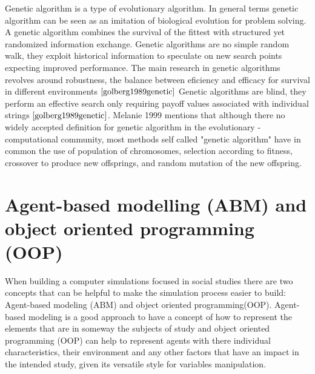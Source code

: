 Genetic algorithm is a type of evolutionary algorithm. In general terms genetic algorithm can be seen as an imitation of biological evolution for problem solving. A genetic algorithm combines the survival of the fittest with  structured yet randomized information exchange. Genetic algorithms are no simple random walk, they exploit historical information to speculate on new search points expecting improved performance. The main research in genetic algorithms revolves around robustness, the balance between eficiency and efficacy for survival in different environments $\cite{golberg1989genetic}$ Genetic algorithms are blind, they perform an effective search only requiring payoff values associated with individual strings $\cite{golberg1989genetic}$.  Melanie 1999 mentions that although there no widely accepted definition for genetic algorithm in the evolutionary - computational community, most methods self called "genetic algorithm" have in common the use of population of chromosomes, selection according to fitness, crossover to produce new offsprings, and random mutation of the new offspring.  

\section{Agent-based modelling (ABM) and object oriented programming (OOP)} \label{ABM}
When building a computer simulations focused in social studies there are two concepts that can be helpful to make the simulation process easier to build: Agent-based modeling (ABM) and object oriented programming(OOP). Agent-based modeling is a good approach to have a concept of how to represent the elements that are in someway the subjects of study and object oriented programming (OOP) can help to represent agents with there individual characteristics, their environment and any other factors that have an impact in the intended study, given its versatile style for variables manipulation.
